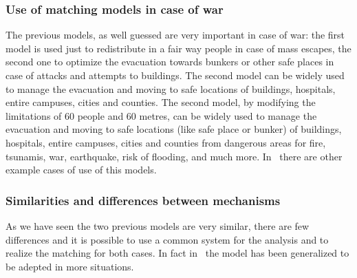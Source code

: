 \subsubsection{Use of matching models in case of war}\label{use-of-matching-model-in-case-of-war}%
The previous models, as well guessed are very important in case of war: the first model is used just to redistribute in a fair way people in case of mass escapes, the second one to optimize the evacuation
towards bunkers or other safe places in case of attacks and attempts to buildings.
The second model can be widely used to manage the evacuation and moving to safe locations of buildings, hospitals, entire campuses, cities and counties.
The second model, by modifying the limitations of 60 people and 60 metres, can be widely used to manage the evacuation and moving to safe locations (like safe place or bunker) of buildings, hospitals,
entire campuses, cities and counties from dangerous areas for fire, tsunamis, war, earthquake, risk of flooding, and much more.
In~\citet{delacretaz_2020,delacretaz_2019,delacretaz_2016} there are other example cases of use of this models.

\subsubsection{Similarities and differences between mechanisms}\label{similarities-and-differences-between-mechanisms}

As we have seen the two previous models are very similar, there are few differences and it is possible to use a
common system for the analysis and to realize the matching for both cases.
In fact in~\citet{delacretaz_2020} the model has been generalized to be adepted in more situations.
%
